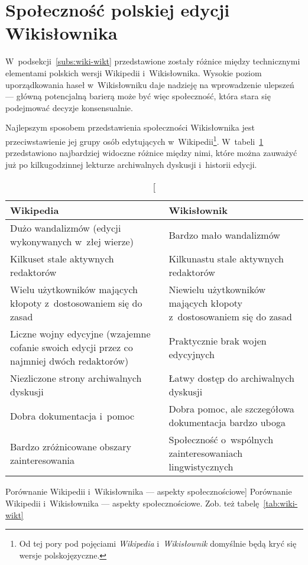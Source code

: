 \section{Społeczność polskiej edycji Wikisłownika}
\label{sec:plsoc}
W~podsekcji~\ref{subs:wiki-wikt} przedstawione zostały różnice między technicznymi elementami polskich wersji Wikipedii i~Wikisłownika. Wysokie poziom uporządkowania haseł w~Wikisłowniku daje nadzieję na wprowadzenie ulepszeń --- główną potencjalną barierą może być więc społeczność, która stara się podejmować decyzje konsensualnie.

Najlepszym sposobem przedstawienia społeczności Wikisłownika jest przeciwstawienie jej grupy osób edytujących w~Wikipedii\footnote{Od tej pory pod pojęciami \emph{Wikipedia} i~\emph{Wikisłownik} domyślnie będą kryć się wersje polskojęzyczne.}. W~tabeli~\ref{tab:wiki-wikt2} przedstawiono najbardziej widoczne różnice między nimi, które można zauważyć już po kilkugodzinnej lekturze archiwalnych dyskusji i~historii edycji.

\begin{table}[h]
\begin{center}
	\begin{tabularx}{\textwidth}{ XX }
		\toprule \textbf{Wikipedia} & \textbf{Wikisłownik} \\
		\midrule Dużo wandalizmów (edycji wykonywanych w~złej wierze)
			& Bardzo mało wandalizmów \\
		\midrule Kilkuset stale aktywnych redaktorów
			& Kilkunastu stale aktywnych redaktorów \\
		\midrule Wielu użytkowników mających kłopoty z~dostosowaniem się do zasad
			& Niewielu użytkowników mających kłopoty z~dostosowaniem się do zasad \\
		\midrule Liczne wojny edycyjne (wzajemne cofanie swoich edycji przez co najmniej dwóch redaktorów)
			& Praktycznie brak wojen edycyjnych \\
		\midrule Niezliczone strony archiwalnych dyskusji
			& Łatwy dostęp do archiwalnych dyskusji \\
		\midrule Dobra dokumentacja i~pomoc
			& Dobra pomoc, ale szczegółowa dokumentacja bardzo uboga \\
		\midrule Bardzo zróżnicowane obszary zainteresowania
			& Społeczność o~wspólnych zainteresowaniach lingwistycznych \\
		\bottomrule
	\end{tabularx}
\caption
	[Porównanie Wikipedii i~Wikisłownika --- aspekty społecznościowe]
	{Porównanie Wikipedii i~Wikisłownika --- aspekty społecznościowe. Zob. też tabelę~\ref{tab:wiki-wikt}}
\label{tab:wiki-wikt2}
\end{center}
\end{table}

